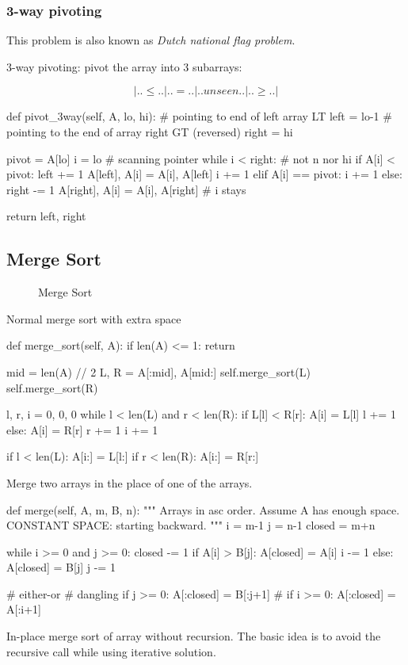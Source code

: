 \subsubsection{3-way pivoting}
This problem is also known as \textit{Dutch national flag problem}.

3-way pivoting: pivot the array into 3 subarrays: 

$$|..\leq..|..=..|..unseen..|..\geq..|$$
\begin{python}
def pivot_3way(self, A, lo, hi):
    # pointing to end of left array LT
    left = lo-1
    # pointing to the end of array right GT (reversed)
    right = hi

    pivot = A[lo]
    i = lo  # scanning pointer
    while i < right:  # not n nor hi
        if A[i] < pivot:
            left += 1
            A[left], A[i] = A[i], A[left]
            i += 1
        elif A[i] == pivot:
            i += 1
        else:
            right -= 1
            A[right], A[i] = A[i], A[right]
            # i stays

    return left, right
\end{python}
\subsection{Merge Sort}
\begin{figure}[!htp]
\centering
{}
\caption{Merge Sort}
\label{fig:msort}
\end{figure}
 Normal merge sort with extra space
\begin{python}
def merge_sort(self, A):
  if len(A) <= 1:
    return

  mid = len(A) // 2
  L, R = A[:mid], A[mid:]
  self.merge_sort(L)
  self.merge_sort(R)

  l, r, i = 0, 0, 0
  while l < len(L) and r < len(R):
    if L[l] < R[r]:
      A[i] = L[l]
      l += 1
    else:
      A[i] = R[r]
      r += 1
    i += 1

  if l < len(L):
    A[i:] = L[l:]
  if r < len(R):
    A[i:] = R[r:]
\end{python}

 Merge two arrays in the place of one of the arrays.  
\begin{python}
def merge(self, A, m, B, n):
  """
  Arrays in asc order.
  Assume A has enough space.
  CONSTANT SPACE: starting backward. 
  """
  i = m-1
  j = n-1
  closed = m+n

  while i >= 0 and j >= 0:
    closed -= 1
    if A[i] > B[j]:
      A[closed] = A[i]
      i -= 1
    else:
      A[closed] = B[j]
      j -= 1

  # either-or
  # dangling
  if j >= 0: A[:closed] = B[:j+1]
  # if i >= 0: A[:closed] = A[:i+1]
\end{python}
In-place merge sort of array without recursion. The basic idea is to avoid the recursive call while using iterative solution.

